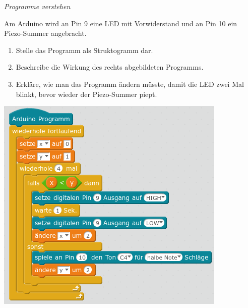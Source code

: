 \begin{aufgabe} \emph{Programme verstehen}
	
	\begin{minipage}{0.54\textwidth}
		Am Arduino wird an Pin 9 eine LED mit Vorwiderstand und an Pin 10 ein Piezo-Summer angebracht.
		\begin{enumerate}[label=\alph*),itemsep=0mm, parsep=0mm]
			\item Stelle das Programm als Struktogramm dar.
			\item Beschreibe die Wirkung des rechts abgebildeten Programms.
			\item Erkläre, wie man das Programm ändern müsste, damit die LED zwei Mal blinkt, bevor wieder der Piezo-Summer piept.
		\end{enumerate}
		\vspace{2\baselineskip}
	\end{minipage}
	\hfill
	\begin{minipage}{0.45\textwidth}
		\centering
		\includegraphics[width=\textwidth]{./pics/Uebung-Variablen-und-Schleifen.png}
	\end{minipage}
\end{aufgabe}

